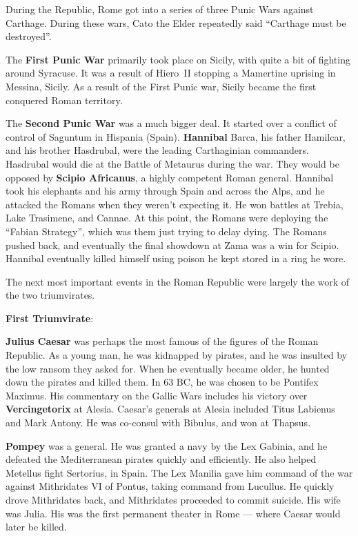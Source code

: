 During the Republic, Rome got into a series of three Punic Wars against Carthage.
During these wars, Cato the Elder repeatedly said ``Carthage must be destroyed''.

The \textbf{First Punic War} primarily took place on Sicily, with quite a bit of fighting around Syracuse.
It was a result of Hiero~II stopping a Mamertine uprising in Messina, Sicily.
As a result of the First Punic war, Sicily became the first conquered Roman territory.

The \textbf{Second Punic War} was a much bigger deal.
It started over a conflict of control of Saguntum in Hispania (Spain).
\textbf{Hannibal} Barca, his father Hamilcar, and his brother Hasdrubal, were the leading Carthaginian commanders.
Hasdrubal would die at the Battle of Metaurus during the war.
They would be opposed by \textbf{Scipio Africanus}, a highly competent Roman general.
Hannibal took his elephants and his army through Spain and across the Alps,
and he attacked the Romans when they weren't expecting it.
He won battles at Trebia, Lake Trasimene, and Cannae.
At this point, the Romans were deploying the ``Fabian Strategy'', which was them just trying to delay dying.
The Romans pushed back, and eventually the final showdown at Zama was a win for Scipio.
Hannibal eventually killed himself using poison he kept stored in a ring he wore.

The next most important events in the Roman Republic were largely the work of the two triumvirates.

\textbf{First Triumvirate}:

\textbf{Julius Caesar} was perhaps the most famous of the figures of the Roman Republic.
As a young man, he was kidnapped by pirates, and he was insulted by the low ransom they asked for.
When he eventually became older, he hunted down the pirates and killed them.
In 63 BC, he was chosen to be Pontifex Maximus.
His commentary on the Gallic Wars includes his victory over \textbf{Vercingetorix} at Alesia.
Caesar's generals at Alesia included Titus Labienus and Mark Antony.
He was co-consul with Bibulus, and won at Thapsus.

\textbf{Pompey} was a general. He was granted a navy by the Lex Gabinia, and he defeated
the Mediterranean pirates quickly and efficiently.
He also helped Metellus fight Sertorius, in Spain.
The Lex Manilia gave him command of the war against Mithridates VI of Pontus, taking command from Lucullus.
He quickly drove Mithridates back, and Mithridates proceeded to commit suicide.
His wife was Julia.
His was the first permanent theater in Rome --- where Caesar would later be killed.

